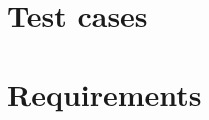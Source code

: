 \documentclass[
    a4paper,      %
    10pt,         %
    openright,    %
    notitlepage,  %
    parskip=half, %
]{scrreprt}       %
\theoremstyle{definition}                    %
\begin{document}
\section{Test cases}
\label{sec:test-cases}

\blindtext{}

\section{Requirements}
\label{sec:requirements}
% 
% 
% 
% 
% 
% 
% 
% 
% 
% 
% 
% 
\end{document}
